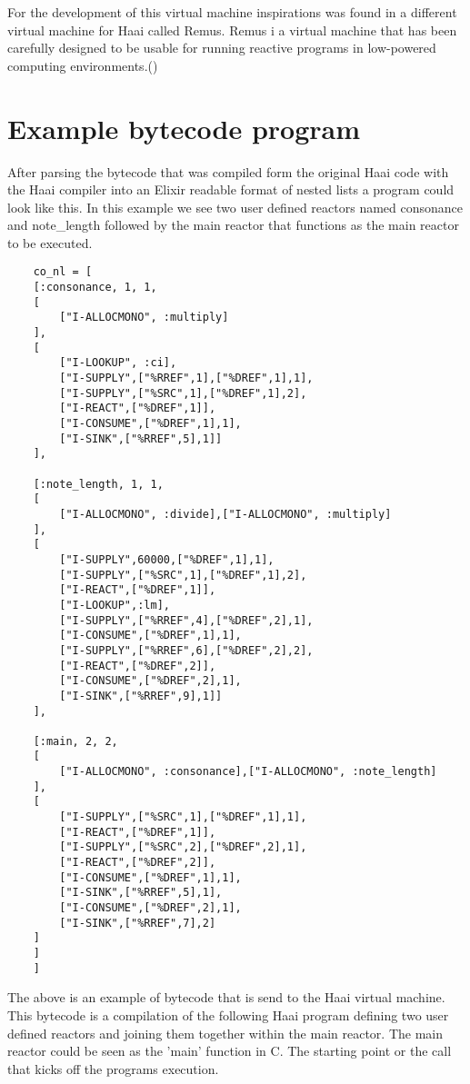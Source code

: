 \documentclass[a4paper]{book}
\begin{document}
For the development of this virtual machine inspirations was found in a different virtual machine for Haai called Remus. Remus i a virtual machine that has been carefully designed to be usable for running reactive programs in low-powered computing environments.(\cite{oeyen_remus_2022}) 

\section{Example bytecode program}

After parsing the bytecode that was compiled form the original Haai code with the Haai compiler into an Elixir readable format of nested lists a program could look like this. In this example we see two user defined reactors named consonance and note\_length followed by the main reactor that functions as the main reactor to be executed. 

\begin{verbatim}
	co_nl = [
	[:consonance, 1, 1,
	[
	    ["I-ALLOCMONO", :multiply]
	],
	[
	    ["I-LOOKUP", :ci],
	    ["I-SUPPLY",["%RREF",1],["%DREF",1],1],
	    ["I-SUPPLY",["%SRC",1],["%DREF",1],2],
	    ["I-REACT",["%DREF",1]],
	    ["I-CONSUME",["%DREF",1],1],
	    ["I-SINK",["%RREF",5],1]]
	],
	
	[:note_length, 1, 1,
	[
	    ["I-ALLOCMONO", :divide],["I-ALLOCMONO", :multiply]
	],
	[
	    ["I-SUPPLY",60000,["%DREF",1],1],
	    ["I-SUPPLY",["%SRC",1],["%DREF",1],2],
	    ["I-REACT",["%DREF",1]],
	    ["I-LOOKUP",:lm],
	    ["I-SUPPLY",["%RREF",4],["%DREF",2],1],
	    ["I-CONSUME",["%DREF",1],1],
	    ["I-SUPPLY",["%RREF",6],["%DREF",2],2],
	    ["I-REACT",["%DREF",2]],
	    ["I-CONSUME",["%DREF",2],1],
	    ["I-SINK",["%RREF",9],1]]
	],
	
	[:main, 2, 2,
	[
	    ["I-ALLOCMONO", :consonance],["I-ALLOCMONO", :note_length]
	],
	[
	    ["I-SUPPLY",["%SRC",1],["%DREF",1],1],
	    ["I-REACT",["%DREF",1]],
	    ["I-SUPPLY",["%SRC",2],["%DREF",2],1],
	    ["I-REACT",["%DREF",2]],
	    ["I-CONSUME",["%DREF",1],1],
	    ["I-SINK",["%RREF",5],1],
	    ["I-CONSUME",["%DREF",2],1],
	    ["I-SINK",["%RREF",7],2]
	]
	]
	]
\end{verbatim}

The above is an example of bytecode that is send to the Haai virtual machine. This bytecode is a compilation of the following Haai program defining two user defined reactors and joining them together within the main reactor. The main reactor could be seen as the 'main' function in C. The starting point or the call that kicks off the programs execution.
\end{document}

